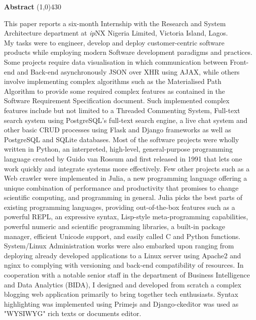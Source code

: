 \begin{center}
	{\huge \bf Abstract}
	\line(1,0){430}
\end{center}

This paper reports a six-month Internship with the Research and System Architecture department at \textit{ip}NX Nigeria Limited, Victoria Island, Lagos.\\ 

My tasks were to engineer, develop and deploy customer-centric software products while employing modern Software development paradigms and practices. Some projects require data visualisation in which communication between Front-end and Back-end asynchronously \ac{JSON} over \ac{XHR} using \ac{AJAX}, while others involve implementing complex algorithms such as the Materialised Path Algorithm to provide some required complex features as contained in the Software Requirement Specification document. Such implemented complex features include but not limited to a Threaded Commenting System, Full-text search system using PostgreSQL's full-text search engine, a live chat system and other basic \ac{CRUD} processes using Flask and Django frameworks as well as PostgreSQL and SQLite databases. Most of the software projects were wholly written in Python, an interpreted, high-level, general-purpose programming language created by Guido van Rossum and first released in 1991 that lets one work quickly and integrate systems more effectively. Few other projects such as a Web crawler were implemented in Julia, a new programming language offering a unique combination of performance and productivity that promises to change scientific computing, and programming in general.
Julia picks the best parts of existing programming languages, providing out-of-the-box features such as a powerful \ac{REPL}, an expressive syntax, Lisp-style meta-programming capabilities, powerful numeric and scientific programming libraries, a built-in package manager, efficient Unicode support, and easily called C and Python functions.\\

System/Linux Administration works were also embarked upon ranging from deploying already developed applications to a Linux server using Apache2 and nginx to complying with versioning and back-end compatibility of resources. In cooperation with a notable senior staff in the department of Business Intelligence and Data Analytics (BIDA), I designed and developed from scratch a complex blogging web application  primarily to bring together tech enthusiasts.  Syntax highlighting was implemented using Primejs and Django-ckeditor was used as "\ac{WYSIWYG}" rich texts or documents editor.
\clearpage